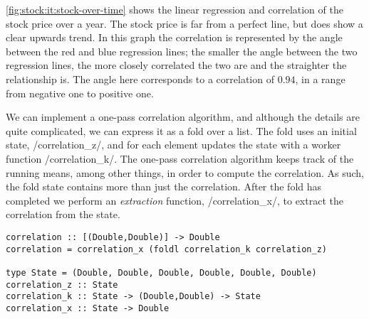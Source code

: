 

\autoref{fig:stock:it:stock-over-time} shows the linear regression and correlation of the stock price over a year.
The stock price is far from a perfect line, but does show a clear upwards trend.
In this graph the correlation is represented by the angle between the red and blue regression lines; the smaller the angle between the two regression lines, the more closely correlated the two are and the straighter the relationship is.
The angle here corresponds to a correlation of $0.94$, in a range from negative one to positive one.


We can implement a one-pass correlation algorithm, and although the details are quite complicated, we can express it as a fold over a list.
The fold uses an initial state, \Hs/correlation_z/, and for each element updates the state with a worker function \Hs/correlation_k/.
The one-pass correlation algorithm keeps track of the running means, among other things, in order to compute the correlation.
As such, the fold state contains more than just the correlation.
After the fold has completed we perform an \emph{extraction} function, \Hs/correlation_x/, to extract the correlation from the state.

\begin{lstlisting}
correlation :: [(Double,Double)] -> Double
correlation = correlation_x (foldl correlation_k correlation_z)

type State = (Double, Double, Double, Double, Double, Double)
correlation_z :: State
correlation_k :: State -> (Double,Double) -> State
correlation_x :: State -> Double
\end{lstlisting}


